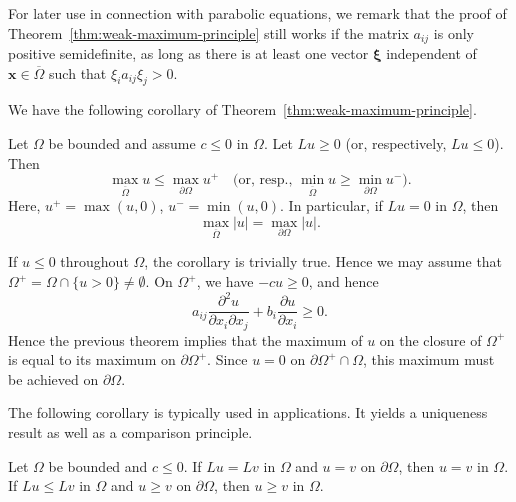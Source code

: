 \begin{Remark}
\label{rem:weak-maximum-semidefinite}
For later use in connection with parabolic equations, we remark that the proof of Theorem~\ref{thm:weak-maximum-principle} still works if the matrix $a_{ij}$ is only positive semidefinite, as long as there is at least one vector $\bm{\xi}$ independent of $\bm{x}\in\overline\Omega$ such that $\xi_i a_{ij}\xi_j>0$.
\end{Remark}

We have the following corollary of Theorem~\ref{thm:weak-maximum-principle}.

\begin{Corollary}
\label{cor:weak-maximum-nonpositive-zero-order}
Let $\Omega$ be bounded and assume $c\leq0$ in $\Omega$. Let $Lu\geq0$ (or, respectively, $Lu\leq0$). Then
\begin{equation}\label{eq:weak-maximum-positive-negative-parts}
\max_{\overline\Omega}u\leq\max_{\partial\Omega}u^+\quad\text{(or, resp., }\min_{\overline\Omega}u\geq\min_{\partial\Omega}u^-\text{)}.
\end{equation}
Here, $u^+=\max(u,0)$, $u^-=\min(u,0)$. In particular, if $Lu=0$ in $\Omega$, then
\begin{equation}\label{eq:weak-maximum-absolute-value-boundary}
\max_{\overline\Omega}|u|=\max_{\partial\Omega}|u|.
\end{equation}

\end{Corollary}

\begin{Proof}
If $u\leq0$ throughout $\Omega$, the corollary is trivially true. Hence we may assume that $\Omega^+=\Omega\cap\{u>0\}\ne\emptyset$. On $\Omega^+$, we have $-cu\geq0$, and hence
\begin{equation}\label{eq:positive-set-zero-order-free-inequality}
a_{ij}\dfrac{\partial^2u}{\partial x_i\partial x_j}+b_i\dfrac{\partial u}{\partial x_i}\geq0.
\end{equation}
Hence the previous theorem implies that the maximum of $u$ on the closure of $\Omega^+$ is equal to its maximum on $\partial\Omega^+$. Since $u=0$ on $\partial\Omega^+\cap\Omega$, this maximum must be achieved on $\partial\Omega$.
\end{Proof}

The following corollary is typically used in applications. It yields a uniqueness result as well as a comparison principle.

\begin{Corollary}
\label{cor:elliptic-comparison}
Let $\Omega$ be bounded and $c\leq0$. If $Lu=Lv$ in $\Omega$ and $u=v$ on $\partial\Omega$, then $u=v$ in $\Omega$. If $Lu\leq Lv$ in $\Omega$ and $u\geq v$ on $\partial\Omega$, then $u\geq v$ in $\Omega$.
\end{Corollary}

